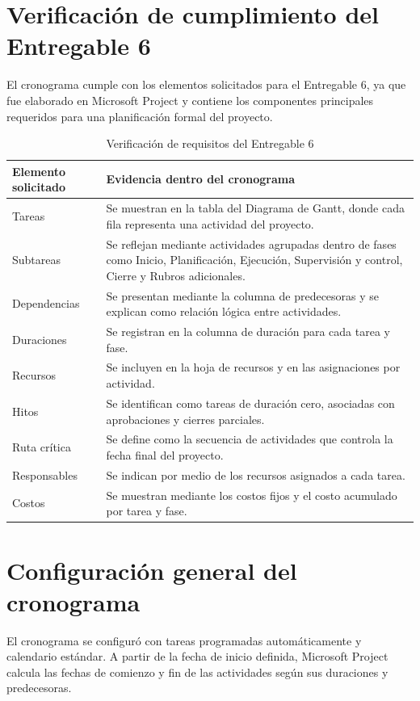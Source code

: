 \documentclass[11pt,spanish]{article}
\begin{document}
\section{Verificación de cumplimiento del Entregable 6}

El cronograma cumple con los elementos solicitados para el Entregable 6, ya que fue elaborado en Microsoft Project y contiene los componentes principales requeridos para una planificación formal del proyecto.

\begin{table}[H]
\centering
\caption{Verificación de requisitos del Entregable 6}
\begin{tabularx}{\textwidth}{p{4.3cm} Y}
\toprule
\textbf{Elemento solicitado} & \textbf{Evidencia dentro del cronograma} \\
\midrule
Tareas & Se muestran en la tabla del Diagrama de Gantt, donde cada fila representa una actividad del proyecto. \\
Subtareas & Se reflejan mediante actividades agrupadas dentro de fases como Inicio, Planificación, Ejecución, Supervisión y control, Cierre y Rubros adicionales. \\
Dependencias & Se presentan mediante la columna de predecesoras y se explican como relación lógica entre actividades. \\
Duraciones & Se registran en la columna de duración para cada tarea y fase. \\
Recursos & Se incluyen en la hoja de recursos y en las asignaciones por actividad. \\
Hitos & Se identifican como tareas de duración cero, asociadas con aprobaciones y cierres parciales. \\
Ruta crítica & Se define como la secuencia de actividades que controla la fecha final del proyecto. \\
Responsables & Se indican por medio de los recursos asignados a cada tarea. \\
Costos & Se muestran mediante los costos fijos y el costo acumulado por tarea y fase. \\
\bottomrule
\end{tabularx}
\end{table}

\section{Configuración general del cronograma}

El cronograma se configuró con tareas programadas automáticamente y calendario estándar. A partir de la fecha de inicio definida, Microsoft Project calcula las fechas de comienzo y fin de las actividades según sus duraciones y predecesoras.
\end{document}

